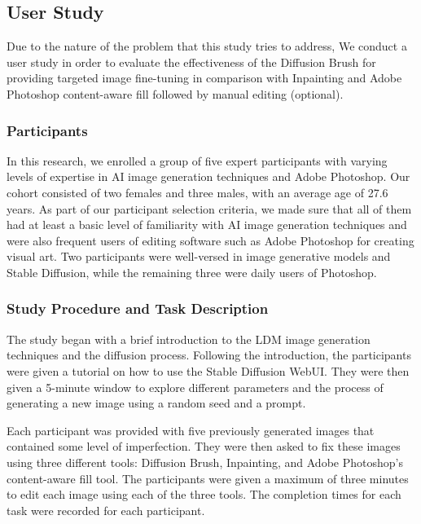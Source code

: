 \documentclass[10pt,twocolumn,letterpaper]{article}
\begin{document}
\subsection{User Study}
\label{user-study}
Due to the nature of the problem that this study tries to address, We conduct a user study in order to evaluate the effectiveness of the Diffusion Brush for providing targeted image fine-tuning in comparison with Inpainting and Adobe Photoshop content-aware fill followed by manual editing (optional).

\subsubsection{Participants}

In this research, we enrolled a group of five expert participants with varying levels of expertise in AI image generation techniques and Adobe Photoshop. Our cohort consisted of two females and three males, with an average age of 27.6 years. As part of our participant selection criteria, we made sure that all of them had at least a basic level of familiarity with AI image generation techniques and were also frequent users of editing software such as Adobe Photoshop for creating visual art. Two participants were well-versed in image generative models and Stable Diffusion, while the remaining three were daily users of Photoshop. %

\subsubsection{Study Procedure and Task Description}
The study began with a brief introduction to the LDM image generation techniques and the diffusion process. Following the introduction, the participants were given a tutorial on how to use the Stable Diffusion WebUI. They were then given a 5-minute window to explore different parameters and the process of generating a new image using a random seed and a prompt.

Each participant was provided with five previously generated images that contained some level of imperfection. They were then asked to fix these images using three different tools: Diffusion Brush, Inpainting, and Adobe Photoshop's content-aware fill tool. The participants were given a maximum of three minutes to edit each image using each of the three tools. The completion times for each task were recorded for each participant.
\end{document}
